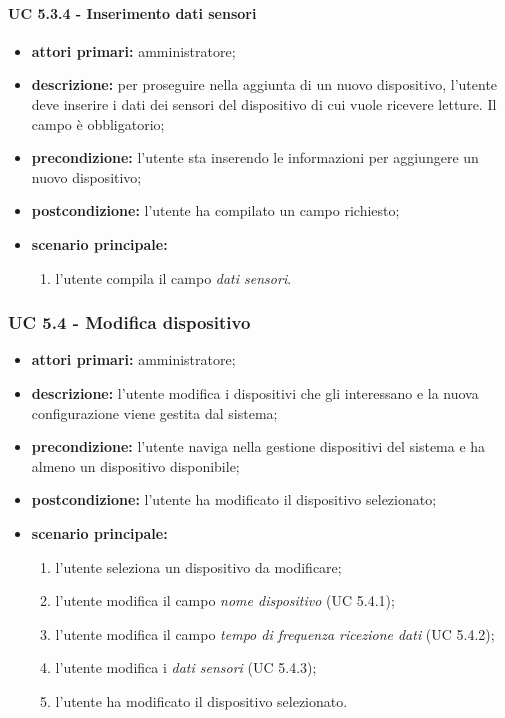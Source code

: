 				\paragraph{UC 5.3.4 - Inserimento dati sensori}
				\begin{itemize}
					\item \textbf{attori primari:} amministratore;
					\item \textbf{descrizione:} per proseguire nella aggiunta di un nuovo dispositivo, l'utente deve inserire i dati dei sensori del dispositivo di cui vuole ricevere letture. Il campo è obbligatorio;
					\item \textbf{precondizione:} l'utente sta inserendo le informazioni per aggiungere un nuovo dispositivo;
					\item \textbf{postcondizione:} l'utente ha compilato un campo richiesto;
					\item \textbf{scenario principale:}
					\begin{enumerate}
						\item{l'utente compila il campo \textit{dati sensori}.}
					\end{enumerate}
				\end{itemize}

			\subsubsection{UC 5.4 - Modifica dispositivo}
			\begin{itemize}
				\item \textbf{attori primari:} amministratore;
				\item \textbf{descrizione:} l'utente modifica i dispositivi che gli interessano e la nuova configurazione viene gestita dal sistema;
				\item \textbf{precondizione:} l'utente naviga nella gestione dispositivi del sistema e ha almeno un dispositivo disponibile;
				\item \textbf{postcondizione:} l'utente ha modificato il dispositivo selezionato;
				\item \textbf{scenario principale:}
				\begin{enumerate}
					\item{l'utente seleziona un dispositivo da modificare;}
					\item{l'utente modifica il campo \textit{nome dispositivo} (UC 5.4.1);}
					\item{l'utente modifica il campo \textit{tempo di frequenza ricezione dati} (UC 5.4.2);}
					\item{l'utente modifica i \textit{dati sensori} (UC 5.4.3);}
					\item{l'utente ha modificato il dispositivo selezionato.}
				\end{enumerate}
			\end{itemize}

